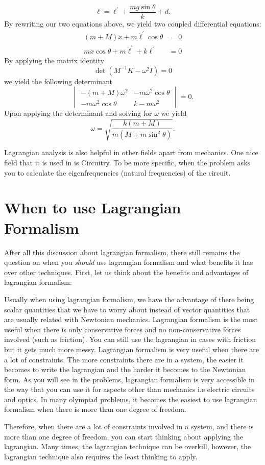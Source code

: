 \documentclass[11pt]{scrartcl}
\begin{document}
\begin{soln}
\[\ell = \ell^{\prime} + \frac{mg\sin\theta}{k} + d.\]
By rewriting our two equations above, we yield two coupled differential equations:
\begin{align*}
    (m + M)\ddot{x} + m\ddot\ell^{\prime} \cos\theta &= 0 \\
    m\ddot{x}\cos\theta + m\ddot\ell^{\prime} + k\ell^{\prime}&= 0
\end{align*}
By applying the matrix identity 
\[\det (M^{-1}K - \omega^2 I) = 0\]
we yield the following determinant 
\[\begin{vmatrix}
-(m + M)\omega^2 & -m\omega^2\cos\theta \\
-m\omega^2\cos\theta & k - m\omega^2
\end{vmatrix}
= 0.\]
Upon applying the determinant and solving for $\omega$ we yield 
\[\omega = \sqrt{\frac{k (m + M)}{m (M + m\sin^2\theta)}}.\]
\end{soln}
Lagrangian analysis is also helpful in other fields apart from mechanics. One nice field that it is used in is Circuitry. To be more specific, when the problem asks you to calculate the eigenfrequencies (natural frequencies) of the circuit. 

\newpage 
\section{When to use Lagrangian Formalism}

After all this discussion about lagrangian formalism, there still remains the question on when you \textit{should} use lagrangian formalism and what benefits it has over other techniques. First, let us think about the benefits and advantages of lagrangian formalism:
\begin{itemize}
    \ii Usually when using lagrangian formalism, we have the advantage of there being scalar quantities that we have to worry about instead of vector quantities that are usually related with Newtonian mechanics. 
    \ii Lagrangian formalism is the most useful when there is only conservative forces and no non-conservative forces involved (such as friction). You can still use the lagrangian in cases with friction but it gets much more messy. 
    \ii Lagrangian formalism is very useful when there are a lot of constraints. The more constraints there are in a system, the easier it becomes to write the lagrangian and the harder it becomes to the Newtonian form. 
    \ii As you will see in the problems, lagrangian formalism is very accessible in the way that you can use it for aspects other than mechanics i.e electric circuits and optics. 
    \ii In many olympiad problems, it becomes the easiest to use lagrangian formalism when there is more than one degree of freedom. 
\end{itemize}
Therefore, when there are a lot of constraints involved in a system, and there is more than one degree of freedom, you can start thinking about applying the lagrangian. Many times, the lagrangian technique can be overkill, however, the lagrangian technique also requires the least thinking to apply. 
\newpage 
\end{document}

